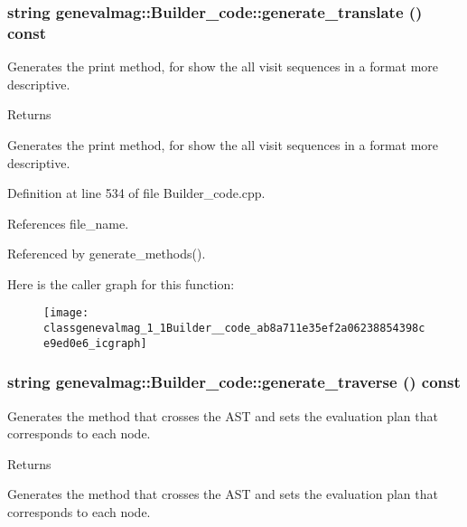 \hypertarget{classgenevalmag_1_1Builder__code_ab8a711e35ef2a06238854398ce9ed0e6}{
\subsubsection[{generate\_\-translate}]{\setlength{\rightskip}{0pt plus 5cm}string genevalmag::Builder\_\-code::generate\_\-translate () const}}
\label{classgenevalmag_1_1Builder__code_ab8a711e35ef2a06238854398ce9ed0e6}
Generates the print method, for show the all visit sequences in a format more descriptive. \begin{DoxyReturn}{Returns}

\end{DoxyReturn}
Generates the print method, for show the all visit sequences in a format more descriptive. 

Definition at line 534 of file Builder\_\-code.cpp.



References file\_\-name.



Referenced by generate\_\-methods().



Here is the caller graph for this function:\nopagebreak
\begin{figure}[H]
\begin{center}
\leavevmode
\texttt{[image: classgenevalmag\_1\_1Builder\_\_code\_ab8a711e35ef2a06238854398ce9ed0e6\_icgraph]}
\end{center}
\end{figure}


\hypertarget{classgenevalmag_1_1Builder__code_a1b3412a660f7d69345932171709cf6d6}{
\subsubsection[{generate\_\-traverse}]{\setlength{\rightskip}{0pt plus 5cm}string genevalmag::Builder\_\-code::generate\_\-traverse () const}}
\label{classgenevalmag_1_1Builder__code_a1b3412a660f7d69345932171709cf6d6}
Generates the method that crosses the AST and sets the evaluation plan that corresponds to each node. \begin{DoxyReturn}{Returns}

\end{DoxyReturn}
Generates the method that crosses the AST and sets the evaluation plan that corresponds to each node. 

